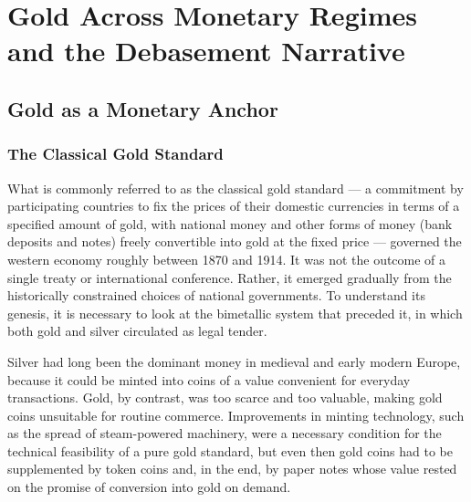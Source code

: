 \chapter{Gold Across Monetary Regimes and the Debasement Narrative}
\sourceassetnote
\section{Gold as a Monetary Anchor}
\subsection{The Classical Gold Standard}
What is commonly referred to as the classical gold standard --- a commitment by participating countries to fix the prices of their domestic currencies in terms of a specified amount of gold, with national money and other forms of money (bank deposits and notes) freely convertible into gold at the fixed price --- governed the western economy roughly between 1870 and 1914. It was not the outcome of a single treaty or international conference. Rather, it emerged gradually from the historically constrained choices of national governments. To understand its genesis, it is necessary to look at the bimetallic system that preceded it, in which both gold and silver circulated as legal tender.
 
Silver had long been the dominant money in medieval and early modern Europe, because it could be minted into coins of a value convenient for everyday transactions. Gold, by contrast, was too scarce and too valuable, making gold coins unsuitable for routine commerce. Improvements in minting technology, such as the spread of steam-powered machinery, were a necessary condition for the technical feasibility of a pure gold standard, but even then gold coins had to be supplemented by token coins and, in the end, by paper notes whose value rested on the promise of conversion into gold on demand.
 
